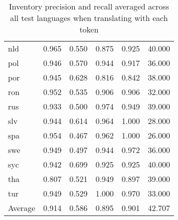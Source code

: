 \begin{table}[h]
\begin{tabular}{lrr|rr|r}
nld        &             0.965 &               0.550 &          0.875 &            0.925 &                      40.000 \\
pol        &             0.946 &               0.570 &          0.944 &            0.917 &                      36.000 \\
por        &             0.945 &               0.628 &          0.816 &            0.842 &                      38.000 \\
ron        &             0.952 &               0.535 &          0.906 &            0.906 &                      32.000 \\
rus        &             0.933 &               0.500 &          0.974 &            0.949 &                      39.000 \\
slv        &             0.944 &               0.614 &          0.964 &            1.000 &                      28.000 \\
spa        &             0.954 &               0.467 &          0.962 &            1.000 &                      26.000 \\
swe        &             0.949 &               0.497 &          0.944 &            0.972 &                      36.000 \\
syc        &             0.942 &               0.699 &          0.925 &            0.925 &                      40.000 \\
tha        &             0.807 &               0.521 &          0.949 &            0.897 &                      39.000 \\
tur        &             0.949 &               0.529 &          1.000 &            0.970 &                      33.000 \\
\midrule
Average    &             0.914 &               0.586 &          0.895 &            0.901 &                      42.707 \\
\bottomrule
\end{tabular}
\caption{Inventory precision and recall averaged across all test languages when translating with each token}
\label{table:inventory}
\end{table}

